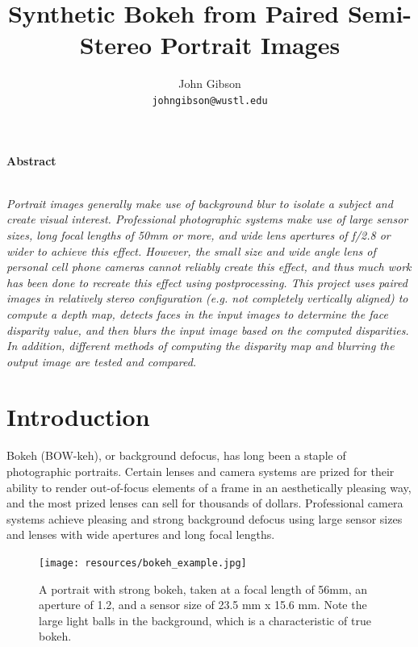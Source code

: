 \documentclass[10pt,twocolumn,letterpaper]{article}
\date{}
\title{Synthetic Bokeh from Paired Semi-Stereo Portrait Images}
\author{%
John Gibson\\
{\tt johngibson@wustl.edu}
}
\begin{document}
\maketitle

\begin{center}\textbf{Abstract}\\~\\\parbox{0.475\textwidth}{\em
    Portrait images generally make use of background blur to isolate a subject and create visual interest.
Professional photographic systems make use of large sensor sizes, long focal lengths of 50mm or more, and wide lens apertures of f/2.8 or wider
to achieve this effect. However, the small size and wide angle lens of personal cell phone cameras cannot reliably create this effect,
and thus much work has been done to recreate this effect using postprocessing. This project uses paired images in relatively stereo configuration
(e.g. not completely vertically aligned) to compute a depth map, detects faces in the input images to determine the face disparity value, and
then blurs the input image based on the computed disparities. In addition, different methods of computing the disparity map and blurring the
output image are tested and compared.

}\end{center}

\section{Introduction}

\par Bokeh (BOW-keh), or background defocus, has long been a staple of photographic portraits. Certain lenses and camera systems are prized for their ability
to render out-of-focus elements of a frame in an aesthetically pleasing way, and the most prized lenses can sell for thousands of dollars. Professional
camera systems achieve pleasing and strong background defocus using large sensor sizes and lenses with wide apertures and long focal lengths.

\begin{figure}[!t]
    \begin{center}
        \texttt{[image: resources/bokeh\_example.jpg]} %
    \end{center}
    \caption{\small A portrait with strong bokeh, taken at a focal length of 56mm, an aperture of 1.2, and a sensor size of 23.5 mm x 15.6 mm. Note the large light balls in the background, which is a characteristic of true bokeh.}
    \label{fig:bokehexample}
\end{figure}
\end{document}
